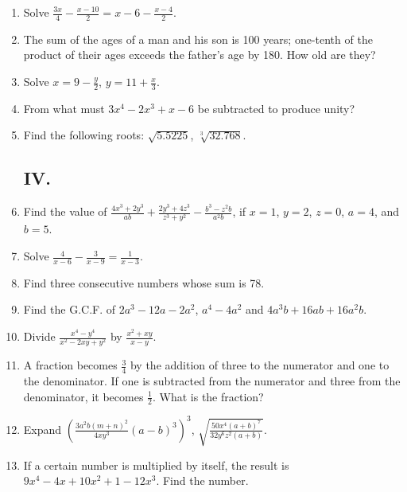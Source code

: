 \documentclass{book}
\begin{document}
\begin{enumerate}
\item Solve $\displaystyle \frac{3x}{4} - \frac{x-10}{2} = x -6
-\frac{x-4}{2}$.

\item The sum of the ages of a man and his son is 100
years; one-tenth of the product of their ages exceeds the
father's age by 180. How old are they?

\item Solve $x = 9 - \frac{y}{2}$, $y = 11 + \frac{x}{3}$.

\item From what must $3x^4 - 2x^3 + x - 6$ be subtracted
to produce unity?

\item Find the following roots: $\sqrt{5.5225}$, $\sqrt[3]{32.768}$.

\subsection*{IV.}

\item Find the value of $\displaystyle \frac{4x^3+2y^3}{ab} +
\frac{2y^3 + 4z^3}{z^3+y^2} - \frac{b^3-z^2b}{a^2 b}$, if $x=1$,
$y = 2$, $z = 0$, $a = 4$, and $b = 5$.

\item Solve $\displaystyle \frac{4}{x-6} - \frac{3}{x-9} =
\frac{1}{x-3}$.

\item Find three consecutive numbers whose sum is 78.

\item Find the G.C.F. of $2a^3 - 12a - 2a^2$, $a^4 - 4a^2$ and
$4a^3b + 16ab + 16a^2b$.

\item Divide $\displaystyle \frac{x^4 - y^4}{x^2 - 2xy + y^2}$ by
$\frac{x^2 + xy}{x-y}$.

\item A fraction becomes $\frac{3}{4}$ by the addition of three to the
numerator and one to the denominator. If one is subtracted
from the numerator and three from the denominator, it becomes
$\frac{1}{2}$. What is the fraction?

\item Expand
$\left(\frac{3a^2b\left(m+n\right)^2}{4xy^3}\left(a-b\right)^3\right)^3$,
$\sqrt{\frac{50x^4\left(a+b\right)^7}{32y^6z^2(a+b)}}$.

\item If a certain number is multiplied by itself, the result is
$9x^4 - 4x + 10x^2 + 1 - 12x^3$. Find the number.


\end{enumerate}
\end{document}
